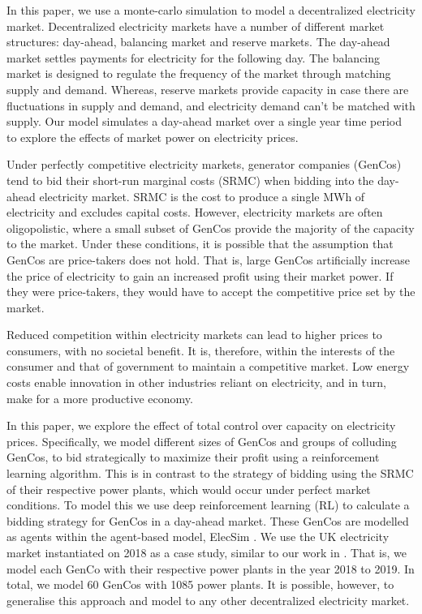 \documentclass[conference]{IEEEtran}
\begin{document}
In this paper, we use a monte-carlo simulation to model a decentralized electricity market. Decentralized electricity markets have a number of different market structures: day-ahead, balancing market and reserve markets. The day-ahead market settles payments for electricity for the following day. The balancing market is designed to regulate the frequency of the market through matching supply and demand. Whereas, reserve markets provide capacity in case there are fluctuations in supply and demand, and electricity demand can't be matched with supply. Our model simulates a day-ahead market over a single year time period to explore the effects of market power on electricity prices.

Under perfectly competitive electricity markets, generator companies (GenCos) tend to bid their short-run marginal costs (SRMC) when bidding into the day-ahead electricity market. SRMC is the cost to produce a single MWh of electricity and excludes capital costs. However, electricity markets are often oligopolistic, where a small subset of GenCos provide the majority of the capacity to the market. Under these conditions, it is possible that the assumption that GenCos are price-takers does not hold. That is, large GenCos artificially increase the price of electricity to gain an increased profit using their market power. If they were price-takers, they would have to accept the competitive price set by the market.

Reduced competition within electricity markets can lead to higher prices to consumers, with no societal benefit. It is, therefore, within the interests of the consumer and that of government to maintain a competitive market. Low energy costs enable innovation in other industries reliant on electricity, and in turn, make for a more productive economy. %

In this paper, we explore the effect of total control over capacity on electricity prices. Specifically, we model different sizes of GenCos and groups of colluding GenCos, to bid strategically to maximize their profit using a reinforcement learning algorithm. This is in contrast to the strategy of bidding using the SRMC of their respective power plants, which would occur under perfect market conditions. To model this we use deep reinforcement learning (RL) to calculate a bidding strategy for GenCos in a day-ahead market. These GenCos are modelled as agents within the agent-based model, ElecSim \cite{Kell, Kell2020}. We use the UK electricity market instantiated on 2018 as a case study, similar to our work in \cite{Kell2019a}. That is, we model each GenCo with their respective power plants in the year 2018 to 2019. In total, we model 60 GenCos with 1085 power plants. It is possible, however, to generalise this approach and model to any other decentralized electricity market. 
\end{document}
